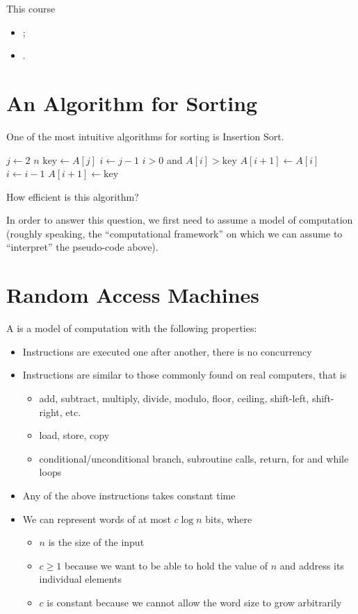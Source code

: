 \documentclass[a4paper]{report}
\newcommand{\bookref}[3]{\marginpar{\faBook{}~#1\\Chapter #2\\Section #3}}
\theoremstyle{definition}
\begin{document}
This course
\begin{itemize}
\item {};
\item {}.
\end{itemize}


\section{An Algorithm for Sorting}
\bookref{CLRS}{2}{2.1}
One of the most intuitive algorithms for sorting is Insertion Sort.
%
\begin{codebox}
\li \For $j \gets 2$ \To $n$ \Do
\li $\text{key} \gets A[j]$
\li $i \gets j-1$
\li \While $i > 0$ and $A[i] > \text{key}$ \Do
\li $A[i+1] \gets A[i]$
\li $i \gets i-1$
\End
\li $A[i+1] \gets \text{key}$
\End
\end{codebox}

How efficient is this algorithm?

In order to answer this question, we first need to assume a model of computation (roughly speaking, the ``computational framework'' on which we can assume to ``interpret'' the pseudo-code above).

\section{Random Access Machines}
\bookref{CLRS}{2}{2.2}
A  is a model of computation with the following properties:
\begin{itemize}
\item Instructions are executed one after another, there is no concurrency
\item Instructions are similar to those commonly found on real computers, that is
\begin{itemize}
\item {} add, subtract, multiply, divide, modulo, floor, ceiling, shift-left, shift-right, etc.
\item {} load, store, copy
\item {} conditional/unconditional branch, subroutine calls, return, for and while loops
\end{itemize}
\item Any of the above instructions takes constant time
\item We can represent words of at most $c \log n$ bits, where
\begin{itemize}
\item $n$ is the size of the input
\item $c \geq 1$ because we want to be able to hold the value of $n$ and address its individual elements
\item $c$ is constant because we cannot allow the word size to grow arbitrarily
\end{itemize}
\end{itemize}
\end{document}

